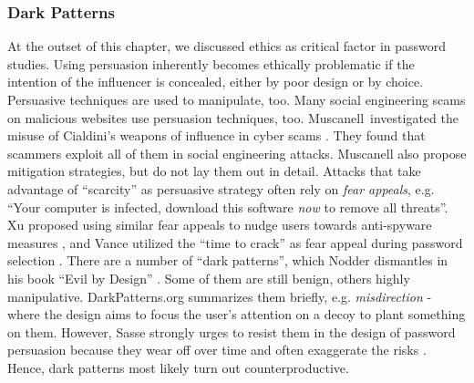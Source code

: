 	\subsubsection{Dark Patterns}
	At the outset of this chapter, we discussed ethics as critical factor in password studies. Using persuasion inherently becomes ethically problematic if the intention of the influencer is concealed, either by poor design or by choice. Persuasive techniques are used to manipulate, too. Many social engineering scams  
	on malicious websites use persuasion techniques, too. Muscanell \etal investigated the misuse of Cialdini's weapons of influence in cyber scams \cite{Muscanell2014WeaponsMisused}. They found that scammers exploit all of them in social engineering attacks. Muscanell \etal also propose mitigation strategies, but do not lay them out in detail. Attacks that take advantage of ``scarcity'' as persuasive strategy often rely on \textit{fear appeals}, e.g. ``Your computer is infected, download this software \textit{now} to remove all threats''. Xu \etal proposed using similar fear appeals to nudge users towards anti-spyware measures \cite{Xu2007FearAppeals}, and Vance \etal utilized the ``time to crack'' as fear appeal during password selection \cite{Vance2013FearAppeals}. There are a number of ``dark patterns'', which Nodder dismantles in his book ``Evil by Design'' \cite{Nodder2013EvilByDesign}. Some of them are still benign, others highly manipulative. DarkPatterns.org summarizes them briefly, e.g. \textit{misdirection} - where the design aims to focus the user's attention on a decoy to plant something on them. However, Sasse strongly urges to resist them in the design of password persuasion because they wear off over time and often exaggerate the risks \cite{Sasse2015ScaringBullying}. Hence, dark patterns most likely turn out counterproductive. 
	
